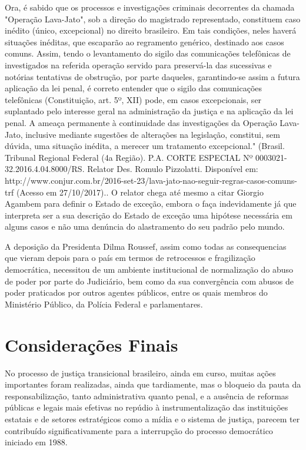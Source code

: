 {  Ora, é sabido que os processos e investigações criminais decorrentes
  da chamada "Operação Lava-Jato", sob a direção do magistrado
  representado, constituem caso inédito (único, excepcional) no direito
  brasileiro. Em tais condições, neles haverá situações inéditas, que
  escaparão ao regramento genérico, destinado aos casos comuns. Assim,
  tendo o levantamento do sigilo das comunicações telefônicas de
  investigados na referida operação servido para preservá-la das
  sucessivas e notórias tentativas de obstrução, por parte daqueles,
  garantindo-se assim a futura aplicação da lei penal, é correto
  entender que o sigilo das comunicações telefônicas (Constituição, art.
  5º, XII) pode, em casos excepcionais, ser suplantado pelo interesse
  geral na administração da justiça e na aplicação da lei penal. A
  ameaça permanente à continuidade das investigações da Operação
  Lava-Jato, inclusive mediante sugestões de alterações na legislação,
  constitui, sem dúvida, uma situação inédita, a merecer um tratamento
  excepcional." (Brasil. Tribunal Regional Federal (4a Região). P.A.
  CORTE ESPECIAL Nº 0003021-32.2016.4.04.8000/RS. Relator Des. Romulo
  Pizzolatti. Disponível em:
  http://www.conjur.com.br/2016-set-23/lava-jato-nao-seguir-regras-casos-comuns-trf
  (Acesso em 27/10/2017).}. O relator chega até mesmo a citar Giorgio
Agambem para definir o Estado de exceção, embora o faça indevidamente já
que interpreta ser a sua descrição do Estado de exceção uma hipótese
necessária em alguns casos e não uma denúncia do alastramento do seu
padrão pelo mundo.

A deposição da Presidenta Dilma Roussef, assim como todas as
consequencias que vieram depois para o país em termos de retrocessos e
fragilização democrática, necessitou de um ambiente institucional de
normalização do abuso de poder por parte do Judiciário, bem como da sua
convergência com abusos de poder praticados por outros agentes públicos,
entre os quais membros do Ministério Público, da Polícia Federal e
parlamentares.

\section{Considerações Finais}

No processo de justiça transicional brasileiro, ainda em curso, muitas
ações importantes foram realizadas, ainda que tardiamente, mas o
bloqueio da pauta da responsabilização, tanto administrativa quanto
penal, e a ausência de reformas públicas e legais mais efetivas no
repúdio à instrumentalização das instituições estatais e de setores
estratégicos como a mídia e o sistema de justiça, parecem ter
contribuído significativamente para a interrupção do processo
democrático iniciado em 1988.

